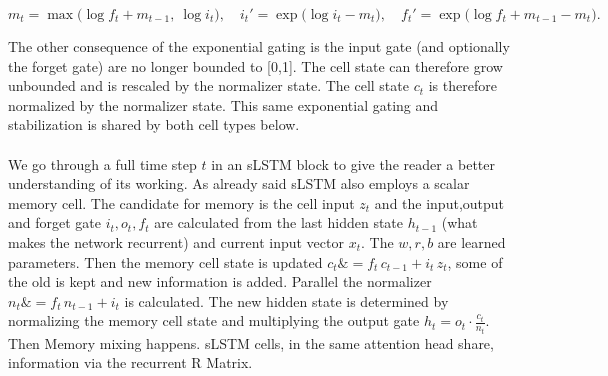 
\begin{equation}

  m_t=\max\!\big(\log f_t + m_{t-1},\ \log i_t\big),\quad

  i_t'=\exp\!\big(\log i_t - m_t\big),\quad

  f_t'=\exp\!\big(\log f_t + m_{t-1} - m_t\big).

  \label{eq:xlstm-stab}

\end{equation}

The other consequence of the exponential gating is the input gate (and optionally the forget gate) are no longer bounded to [0,1]. The cell state can therefore grow unbounded and is rescaled by the normalizer state. The cell state $c_t$ is therefore normalized by the normalizer state. This same exponential gating and stabilization is shared by both cell types below.\\

\\




We go through a full time step $t$ in an sLSTM block to give the reader a better understanding of its working. As already said sLSTM also employs a scalar memory cell. The candidate for memory is the cell input $z_t$ and the input,output and forget gate $i_t,o_t,f_t$ are calculated from the last hidden state $h_{t-1}$ (what makes the network recurrent) and current input vector $x_t$. The $w,r,b$ are learned parameters. Then the memory cell state is updated $c_t \&= f_t\,c_{t-1} + i_t\,z_t$, some of the old is kept and new information is added. Parallel the normalizer $n_t \&= f_t\,n_{t-1} + i_t$ is calculated. The new hidden state is determined by normalizing the memory cell state and multiplying the output gate $h_t = o_t·\frac{c_t}{n_t}$. Then Memory mixing happens. sLSTM cells, in the same attention head share, information via the recurrent R Matrix.

